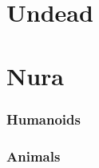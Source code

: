 \documentclass[a4paper,openany]{book}
\begin{document}
\begin{multicols}{2}

\bear

\boar

\chitincrawler

\basilisk

\end{multicols}

\chapter{Undead}

\begin{multicols}{2}

\ghoul

\ghast

\demilich

\lich

\end{multicols}

\chapter{Nura}

\begin{multicols}{2}

\subsection{Humanoids}


\goblin

\goblin

\goblinnuramancer

\hobgoblin

\ogre

\deepogre

\subsection{Animals}

\nurarat

\nurahorse

\nuracrab

\nuracat

\nuraslug

\nuraspider

\nurawolf

\end{multicols}
\end{document}
